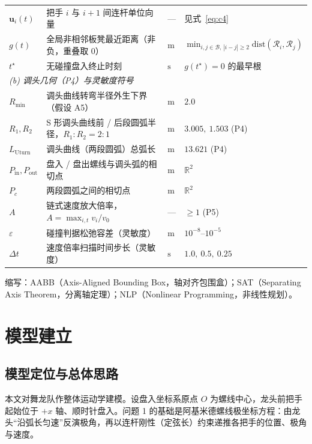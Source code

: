 \documentclass[a4paper, 12pt]{ctexart}
\begin{document}
\begin{table}[H]
\begin{tabular}{llll}
    $\boldsymbol{u}_i(t)$ & 把手 $i$ 与 $i{+}1$ 间连杆单位向量 & --- & 见式~\eqref{eq:c4} \\
    $g(t)$ & 全局非相邻板凳最近距离（非负，重叠取 $0$） & $\mathrm{m}$ & $\min_{i,j\in\mathcal{B},\,|i-j|\ge2}\mathrm{dist}(\mathcal{R}_i,\mathcal{R}_j)$ \\
    $t^\star$ & 无碰撞盘入终止时刻 & $\mathrm{s}$ & $g(t^\star)=0$ 的最早根 \\
    \midrule
    \multicolumn{4}{l}{\textit{(b) 调头几何（P4）与灵敏度符号}}\\
    $R_{\min}$ & 调头曲线转弯半径外生下界（假设 A5） & $\mathrm{m}$ & $2.0$ \\
    $R_1,R_2$ & S 形调头曲线前 / 后段圆弧半径，$R_1{:}R_2{=}2{:}1$ & $\mathrm{m}$ & $3.005,\ 1.503$ (P4) \\
    $L_{\text{Uturn}}$ & 调头曲线（两段圆弧）总弧长 & $\mathrm{m}$ & $13.621$ (P4) \\
    $P_{\text{in}},P_{\text{out}}$ & 盘入 / 盘出螺线与调头弧的相切点 & $\mathrm{m}$ & $\mathbb{R}^2$ \\
    $P_c$ & 两段圆弧之间的相切点 & $\mathrm{m}$ & $\mathbb{R}^2$ \\
    $A$ & 链式速度放大倍率，$A=\max_{i,t}v_i/v_0$ & --- & $\ge1$ (P5) \\
    $\varepsilon$ & 碰撞判据松弛容差（灵敏度） & $\mathrm{m}$ & $10^{-8}$--$10^{-5}$ \\
    $\Delta t$ & 速度倍率扫描时间步长（灵敏度） & $\mathrm{s}$ & $1.0,\ 0.5,\ 0.25$ \\
    \bottomrule
  \end{tabular}
\end{table}

\noindent 缩写：AABB（Axis-Aligned Bounding Box，轴对齐包围盒）；SAT（Separating Axis Theorem，分离轴定理）；NLP（Nonlinear Programming，非线性规划）。

\section{模型建立}
\label{sec:model}

\subsection{模型定位与总体思路}

本文对舞龙队作整体运动学建模。设盘入坐标系原点 $O$ 为螺线中心，龙头前把手起始位于 $+x$ 轴、顺时针盘入。问题 1 的基础是阿基米德螺线极坐标方程：由龙头“沿弧长匀速”反演极角，再以连杆刚性（定弦长）约束递推各把手的位置、极角与速度。
\end{document}
